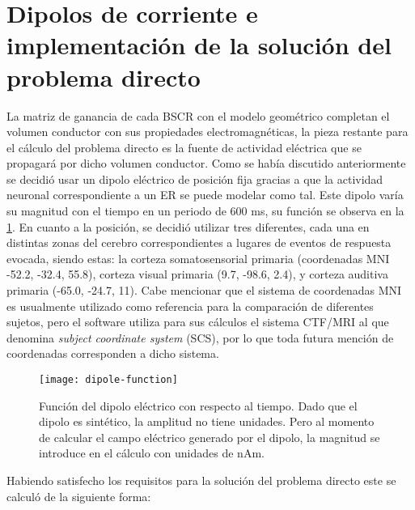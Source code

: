 \section{Dipolos de corriente e implementación de la solución del problema directo}
\label{sec:methodology:direct_solved}

La matriz de ganancia de cada BSCR con el modelo geométrico completan el volumen conductor con sus propiedades electromagnéticas, la pieza restante para el cálculo del problema directo es la fuente de actividad eléctrica que se propagará por dicho volumen conductor.
Como se había discutido anteriormente se decidió usar un dipolo eléctrico de posición fija gracias a que la actividad neuronal correspondiente a un ER se puede modelar como tal. 
Este dipolo varía su magnitud con el tiempo en un periodo de 600 ms, su función se observa en la \cref{fig:methodology:dipole}.
En cuanto a la posición, se decidió utilizar tres diferentes, cada una en distintas zonas del cerebro correspondientes a lugares de eventos de respuesta evocada, siendo estas: la corteza somatosensorial primaria (coordenadas MNI -52.2, -32.4, 55.8), corteza visual primaria (9.7, -98.6, 2.4), y corteza auditiva primaria (-65.0, -24.7, 11).
Cabe mencionar que el sistema de coordenadas MNI es usualmente utilizado como referencia para la comparación de diferentes sujetos, pero el software utiliza para sus cálculos el sistema CTF/MRI al que denomina \emph{subject coordinate system} (SCS), por lo que toda futura mención de coordenadas corresponden a dicho sistema.

\begin{figure}[tb]
	\centering
	\texttt{[image: dipole-function]}
	\caption{Función del dipolo eléctrico con respecto al tiempo. Dado que el dipolo es sintético, la amplitud no tiene unidades. Pero al momento de calcular el campo eléctrico generado por el dipolo, la magnitud se introduce en el cálculo con unidades de nAm.}
	\label{fig:methodology:dipole}
\end{figure}

Habiendo satisfecho los requisitos para la solución del problema directo este se calculó de la siguiente forma:

